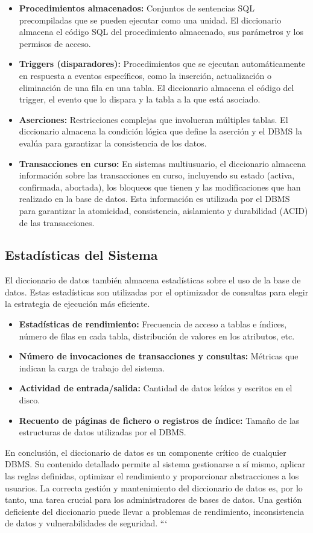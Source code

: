 \begin{itemize}
    \item \textbf{Procedimientos almacenados:}  Conjuntos de sentencias SQL precompiladas que se pueden ejecutar como una unidad. El diccionario almacena el código SQL del procedimiento almacenado, sus parámetros y los permisos de acceso.
    \item \textbf{Triggers (disparadores):}  Procedimientos que se ejecutan automáticamente en respuesta a eventos específicos, como la inserción, actualización o eliminación de una fila en una tabla. El diccionario almacena el código del trigger, el evento que lo dispara y la tabla a la que está asociado.
    \item \textbf{Aserciones:}  Restricciones complejas que involucran múltiples tablas. El diccionario almacena la condición lógica que define la aserción y el DBMS la evalúa para garantizar la consistencia de los datos.
    \item \textbf{Transacciones en curso:}  En sistemas multiusuario, el diccionario almacena información sobre las transacciones en curso, incluyendo su estado (activa, confirmada, abortada), los bloqueos que tienen y las modificaciones que han realizado en la base de datos. Esta información es utilizada por el DBMS para garantizar la atomicidad, consistencia, aislamiento y durabilidad (ACID) de las transacciones.
\end{itemize}

\subsection{Estadísticas del Sistema}

El diccionario de datos también almacena estadísticas sobre el uso de la base de datos. Estas estadísticas son utilizadas por el optimizador de consultas para elegir la estrategia de ejecución más eficiente.

\begin{itemize}
    \item \textbf{Estadísticas de rendimiento:}  Frecuencia de acceso a tablas e índices, número de filas en cada tabla, distribución de valores en los atributos, etc.
    \item \textbf{Número de invocaciones de transacciones y consultas:}  Métricas que indican la carga de trabajo del sistema.
    \item \textbf{Actividad de entrada/salida:}  Cantidad de datos leídos y escritos en el disco.
    \item \textbf{Recuento de páginas de fichero o registros de índice:}  Tamaño de las estructuras de datos utilizadas por el DBMS.
\end{itemize}

En conclusión, el diccionario de datos es un componente crítico de cualquier DBMS. Su contenido detallado permite al sistema gestionarse a sí mismo, aplicar las reglas definidas, optimizar el rendimiento y proporcionar abstracciones a los usuarios. La correcta gestión y mantenimiento del diccionario de datos es, por lo tanto, una tarea crucial para los administradores de bases de datos. Una gestión deficiente del diccionario puede llevar a problemas de rendimiento, inconsistencia de datos y vulnerabilidades de seguridad.
```